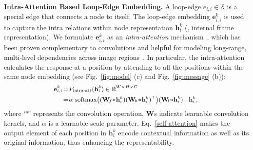 \documentclass[10pt,twocolumn,letterpaper]{article}
\begin{document}
\noindent\textbf{Intra-Attention Based Loop-Edge Embedding.} A loop-edge $e_{i,i}\!\in\!\mathcal{E}$ is a special edge that connects a node to itself. The loop-edge embedding $\mathbf{e}_{i,i}^k$ is used to capture the intra relations within node representation $\mathbf{h}_{i}^k$ (\ie, internal frame representation).
We formulate $\mathbf{e}_{i,i}^k$ as an \textit{intra-attention} mechanism~\cite{DBLP:conf/nips/VaswaniSPUJGKP17,wang2018non}, which has been proven complementary to convolutions and helpful for modeling long-range, multi-level dependencies across
image regions~\cite{zhang2018self}. In particular, the intra-attention calculates the response at a position by attending to all the positions within the same node embedding (see Fig.~\ref{fig:model} (c)  and Fig.~\ref{fig:message} (b)):
	\vspace*{-3pt}
\begin{equation}\small
\begin{aligned}
\!\!\!\!\mathbf{e}_{i,i}^k\! &=\!F_{\text{intra-att}}(\mathbf{h}_{i}^k) \in \mathbb{R}^{W\times H \times C}\\
&=\!\alpha~\text{softmax}\big((\mathbf{W}_{\!f} \!*\! \mathbf{h}_{i}^k) (\mathbf{W}_{\!h}  \!*\! \mathbf{h}_{i}^k)^\top \big)( \mathbf{W}_{\!l} \!*\! \mathbf{h}_{i}^k) \!+\! \mathbf{h}_{i}^k,\!\!
\label{self-attention}
\end{aligned}
	\vspace*{-3pt}
\end{equation}
where \!`$*$'\! represents the convolution operation, $\mathbf{W}$s indicate learnable convolution kernels, and $\alpha$ is a learnable scale parameter. Eq.~\ref{self-attention} makes the output element of each position in  $\mathbf{h}_{i}^k$ encode contextual information as well as its original information, thus enhancing the representability.
\end{document}

